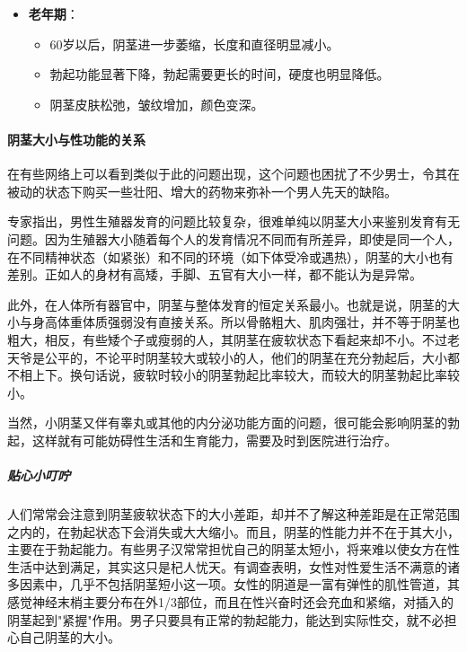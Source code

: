 \begin{itemize}
  \begin{itemize}
  \item 40岁以后，阴茎的勃起功能逐渐下降，勃起频率和硬度有所降低。
  \item 阴茎的长度和直径可能略有减小，皮肤弹性下降。
  \end{itemize}
\item \textbf{老年期}：
  \begin{itemize}
  \item 60岁以后，阴茎进一步萎缩，长度和直径明显减小。
  \item 勃起功能显著下降，勃起需要更长的时间，硬度也明显降低。
  \item 阴茎皮肤松弛，皱纹增加，颜色变深。
  \end{itemize}
\end{itemize}

\paragraph{阴茎大小与性功能的关系}

在有些网络上可以看到类似于此的问题出现，这个问题也困扰了不少男士，令其在被动的状态下购买一些壮阳、增大的药物来弥补一个男人先天的缺陷。

专家指出，男性生殖器发育的问题比较复杂，很难单纯以阴茎大小来鉴别发育有无问题。因为生殖器大小随着每个人的发育情况不同而有所差异，即使是同一个人，在不同精神状态（如紧张）和不同的环境（如下体受冷或遇热），阴茎的大小也有差别。正如人的身材有高矮，手脚、五官有大小一样，都不能认为是异常。

此外，在人体所有器官中，阴茎与整体发育的恒定关系最小。也就是说，阴茎的大小与身高体重体质强弱没有直接关系。所以骨骼粗大、肌肉强壮，并不等于阴茎也粗大，相反，有些矮个子或瘦弱的人，其阴茎在疲软状态下看起来却不小。不过老天爷是公平的，不论平时阴茎较大或较小的人，他们的阴茎在充分勃起后，大小都不相上下。换句话说，疲软时较小的阴茎勃起比率较大，而较大的阴茎勃起比率较小。

当然，小阴茎又伴有睾丸或其他的内分泌功能方面的问题，很可能会影响阴茎的勃起，这样就有可能妨碍性生活和生育能力，需要及时到医院进行治疗。

\subparagraph{贴心小叮咛}

人们常常会注意到阴茎疲软状态下的大小差距，却并不了解这种差距是在正常范围之内的，在勃起状态下会消失或大大缩小。而且，阴茎的性能力并不在于其大小，主要在于勃起能力。有些男子汉常常担忧自己的阴茎太短小，将来难以使女方在性生活中达到满足，其实这只是杞人忧天。有调查表明，女性对性爱生活不满意的诸多因素中，几乎不包括阴茎短小这一项。女性的阴道是一富有弹性的肌性管道，其感觉神经末梢主要分布在外1/3部位，而且在性兴奋时还会充血和紧缩，对插入的阴茎起到"紧握"作用。男子只要具有正常的勃起能力，能达到实际性交，就不必担心自己阴茎的大小。

